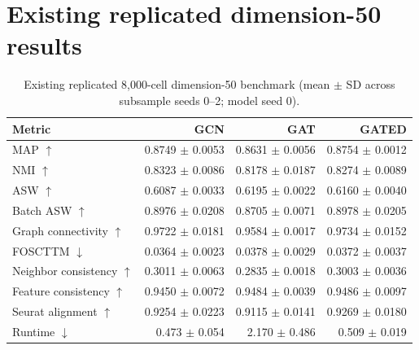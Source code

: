 \documentclass[10pt]{article}
\begin{document}
\section{Existing replicated dimension-50 results}
\begin{table}[H]\centering\scriptsize
\caption{Existing replicated 8,000-cell dimension-50 benchmark (mean $\pm$ SD across subsample seeds 0--2; model seed 0).}
\begin{tabular}{@{}lrrr@{}}\toprule Metric & GCN & GAT & GATED \\\midrule
MAP $\uparrow$ & 0.8749 $\pm$ 0.0053 & 0.8631 $\pm$ 0.0056 & 0.8754 $\pm$ 0.0012 \\
NMI $\uparrow$ & 0.8323 $\pm$ 0.0086 & 0.8178 $\pm$ 0.0187 & 0.8274 $\pm$ 0.0089 \\
ASW $\uparrow$ & 0.6087 $\pm$ 0.0033 & 0.6195 $\pm$ 0.0022 & 0.6160 $\pm$ 0.0040 \\
Batch ASW $\uparrow$ & 0.8976 $\pm$ 0.0208 & 0.8705 $\pm$ 0.0071 & 0.8978 $\pm$ 0.0205 \\
Graph connectivity $\uparrow$ & 0.9722 $\pm$ 0.0181 & 0.9584 $\pm$ 0.0017 & 0.9734 $\pm$ 0.0152 \\
FOSCTTM $\downarrow$ & 0.0364 $\pm$ 0.0023 & 0.0378 $\pm$ 0.0029 & 0.0372 $\pm$ 0.0037 \\
Neighbor consistency $\uparrow$ & 0.3011 $\pm$ 0.0063 & 0.2835 $\pm$ 0.0018 & 0.3003 $\pm$ 0.0036 \\
Feature consistency $\uparrow$ & 0.9450 $\pm$ 0.0072 & 0.9484 $\pm$ 0.0039 & 0.9486 $\pm$ 0.0097 \\
Seurat alignment $\uparrow$ & 0.9254 $\pm$ 0.0223 & 0.9115 $\pm$ 0.0141 & 0.9269 $\pm$ 0.0180 \\
Runtime $\downarrow$ & 0.473 $\pm$ 0.054 & 2.170 $\pm$ 0.486 & 0.509 $\pm$ 0.019 \\
\bottomrule\end{tabular}\end{table}
\end{document}
